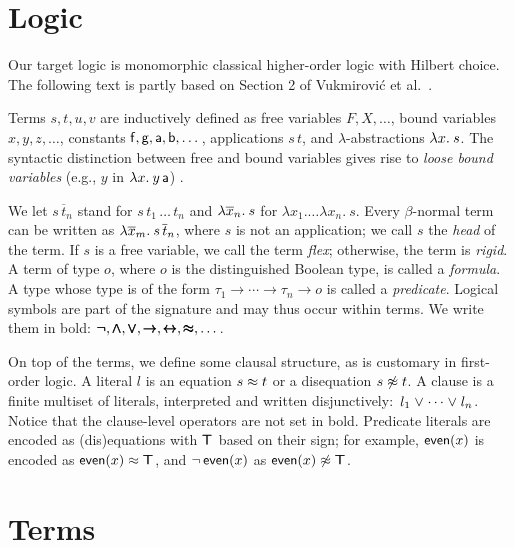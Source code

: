 \section{Logic} %
\label{sec:ehoh2:logic}

Our target logic is monomorphic classical higher-order logic with Hilbert choice.
The following text is partly based on Section 2 of Vukmirovi\'c et al.~\cite{section-making-ho-work}.

Terms $s, t, u, v$ are inductively defined as free variables $F, X, \ldots$, bound variables $x,
y, z, \dotsc$, constants $\mathsf{f}, \mathsf{g},\allowbreak \mathsf{a},\allowbreak \mathsf{b},
\dotsc$, applications $s \, t$, and $\lambda$-abstractions $\lambda x.\> s$.
The syntactic distinction between free and bound variables
gives rise to \emph{loose bound variables} (e.g., $y$ in $\lambda x.\> y \, \mathsf{a}$)
\cite{tn-93-patterns}.

We let $s \, \overline{t}_n$ stand for $s \, t_1 \, \ldots \, t_n$ and
$\lambda \overline{x}_n.\> s$ for $\lambda x_1. \ldots \lambda x_n. \> s$. Every
$\beta$-normal term can be written as $\lambda \overline{x}_m.\> s \,
\overline{t}_n$, where $s$ is not an application; we call $s$ the \emph{head}
of the term. If $s$ is a free variable, we call the term \emph{flex}; otherwise,
the term is \emph{rigid}. A term of type $o$, where $o$ is the distinguished Boolean type,
is called a \emph{formula}. A type whose type is of the form $\tau_1 \to
\cdots \to \tau_n \to o$ is called
a \emph{predicate}. Logical symbols are part of the signature and
may thus occur within terms. We write them in bold: $\pmb{\neg}, \pmb\land, \pmb\lor,
\pmb\rightarrow, \pmb\leftrightarrow, \pmb\approx, \dots$.

On top of the terms, we define some clausal structure, as is customary in
first-order logic.
A literal $l$ is an equation $s \approx t$ or a
disequation $s \not\approx t$. A clause is a finite multiset of literals,
interpreted and written disjunctively:\ $l_1 \mathrel\lor \cdots \mathrel\lor l_n$.
Notice that the clause-level operators are not set in bold.
Predicate literals are encoded as (dis)equations with $\pmb\top$ based on their sign; for
example, $\mathsf{even}(x)$ is encoded as $\mathsf{even}(x) \approx \pmb\top$, and
$\neg\,\mathsf{even}(x)$ as $\mathsf{even}(x) \not\approx \pmb\top$.

\section{Terms}
\label{sec:ehoh2:terms}

